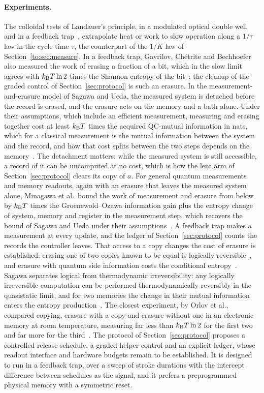 \paragraph{Experiments.} The colloidal tests of Landauer's principle, in a modulated optical double well~\cite{Berut12} and in a feedback trap~\cite{Jun14}, extrapolate heat or work to slow operation along a $1/\tau$ law in the cycle time $\tau$, the counterpart of the $1/K$ law of Section~\ref{to:sec:measure}. In a feedback trap, Gavrilov, Ch\'etrite and Bechhoefer also measured the work of erasing a fraction of a bit, which in the slow limit agrees with $k_{\mathrm B} T\ln2$ times the Shannon entropy of the bit~\cite{Gavrilov17}; the cleanup of the graded control of Section~\ref{sec:protocol} is such an erasure. In the measurement-and-erasure model of Sagawa and Ueda, the measured system is detached before the record is erased, and the erasure acts on the memory and a bath alone. Under their assumptions, which include an efficient measurement, measuring and erasing together cost at least $k_{\mathrm B} T$ times the acquired QC-mutual information in nats, which for a classical measurement is the mutual information between the system and the record, and how that cost splits between the two steps depends on the memory~\cite{SagawaUeda09,SagawaUeda11}. The detachment matters: while the measured system is still accessible, a record of it can be uncomputed at no cost, which is how the lent arm of Section~\ref{sec:protocol} clears its copy of $a$. For general quantum measurements and memory readouts, again with an erasure that leaves the measured system alone, Minagawa et al.\ bound the work of measurement and erasure from below by $k_{\mathrm B} T$ times the Groenewold--Ozawa information gain plus the entropy change of system, memory and register in the measurement step, which recovers the bound of Sagawa and Ueda under their assumptions~\cite[Thm.~1, Sec.~III]{Minagawa25}. A feedback trap makes a measurement at every update, and the ledger of Section~\ref{sec:protocol} counts the records the controller leaves. That access to a copy changes the cost of erasure is established: erasing one of two copies known to be equal is logically reversible~\cite{Bennett73,Bennett03}, and erasure with quantum side information costs the conditional entropy~\cite{delRio11}. Sagawa separates logical from thermodynamic irreversibility: any logically irreversible computation can be performed thermodynamically reversibly in the quasistatic limit, and for two memories the change in their mutual information enters the entropy production~\cite{Sagawa14}. The closest experiment, by Orlov et al., compared copying, erasure with a copy and erasure without one in an electronic memory at room temperature, measuring far less than $k_{\mathrm B} T\ln2$ for the first two and far more for the third~\cite{Orlov12}. The protocol of Section~\ref{sec:protocol} proposes a controlled release schedule, a graded helper control and an explicit ledger, whose readout interface and hardware budgets remain to be established. It is designed to run in a feedback trap, over a sweep of stroke durations with the intercept difference between schedules as the signal, and it prefers a preprogrammed physical memory with a symmetric reset.

